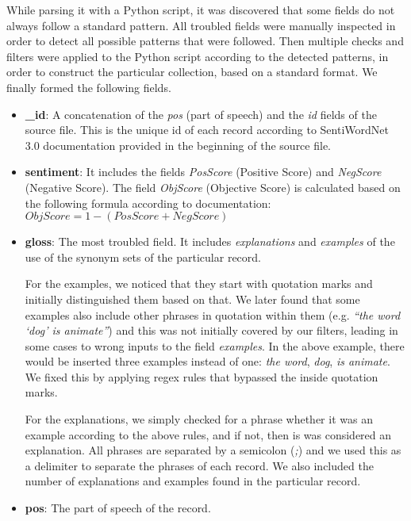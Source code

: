 While parsing it with a Python script, it was discovered that
some fields do not always follow a standard pattern.
All troubled fields were manually inspected
in order to detect all possible patterns that were followed.
Then multiple checks and filters were applied to the Python script 
according to the detected patterns,
in order to construct the particular collection,
based on a standard format.
We finally formed the following fields.

\begin{itemize}
  \item \textbf{\_id}: A concatenation of the \emph{pos} (part of speech)
  and the \emph{id} fields of the source file.
  This is the unique id of each record according to SentiWordNet 3.0
  documentation provided in the beginning of the source file. 
  
  \item \textbf{sentiment}: It includes the fields \emph{PosScore} (Positive Score)
  and \emph{NegScore} (Negative Score).
  The field \emph{ObjScore} (Objective Score) is calculated
  based on the following formula according to documentation: \\
  $ObjScore = 1 - (PosScore + NegScore)$
  
  \item \textbf{gloss}: The most troubled field.
  It includes \emph{explanations} and \emph{examples}
  of the use of the synonym sets of the particular record.

  For the examples, we noticed that they start with quotation marks
  and initially distinguished them based on that.
  We later found that some examples also include other phrases 
  in quotation within them (e.g. \emph{``the word `dog' is animate''})
  and this was not initially covered by our filters,
  leading in some cases to wrong inputs to the field \emph{examples}.
  In the above example, there would be inserted three examples
  instead of one: \emph{the word}, \emph{dog}, \emph{is animate}.
  We fixed this by applying regex rules
  that bypassed the inside quotation marks.

  For the explanations, we simply checked for a phrase
  whether it was an example according to the above rules,
  and if not, then is was considered an explanation.
  All phrases are separated by a semicolon (\emph{;})
  and we used this as a delimiter to separate the phrases
  of each record.
  We also included the number of explanations and examples
  found in the particular record.
  
  \item \textbf{pos}: The part of speech of the record.
  

\end{itemize}
